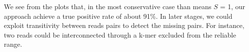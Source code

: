 \documentclass[11pt]{article}
\newcommand\myworries[1]{\textcolor{red}{#1}}
\begin{document}
We see from the plots that, in the most conservative case than means $S$ = 1, our approach achieve a true positive rate of about 91\%.
In later stages, we could exploit transitivity between reads pairs to detect the missing pairs. 
For instance, two reads could be interconnected through a k-mer excluded from the reliable range.
\end{document}
